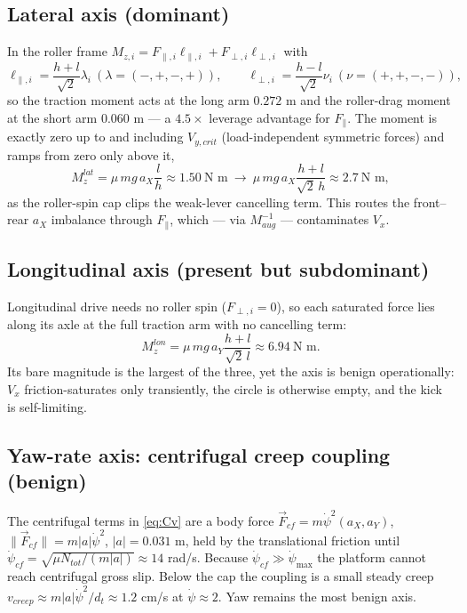 \documentclass[11pt]{article}
\begin{document}
\subsection{Lateral axis (dominant)}
In the roller frame $M_{z,i}=F_{\parallel,i}\ell_{\parallel,i}+F_{\perp,i}\ell_{\perp,i}$ with
\begin{equation}
\ell_{\parallel,i}=\frac{h+l}{\sqrt2}\lambda_i\ (\lambda=(-,+,-,+)),\qquad
\ell_{\perp,i}=\frac{h-l}{\sqrt2}\nu_i\ (\nu=(+,+,-,-)),
\label{eq:arms}
\end{equation}
so the traction moment acts at the long arm $0.272$ m and the roller-drag moment at the short arm
$0.060$ m --- a $4.5\times$ leverage advantage for $F_\parallel$. The moment is exactly zero up to
and including $V_{y,crit}$ (load-independent symmetric forces) and ramps from zero only above it,
\begin{equation}
M_z^{lat}=\mu\,mg\,a_X\frac{l}{h}\approx1.50\ \text{N m}\ \longrightarrow\ \mu\,mg\,a_X\frac{h+l}{\sqrt2\,h}\approx2.7\ \text{N m},
\end{equation}
as the roller-spin cap clips the weak-lever cancelling term. This routes the front--rear $a_X$
imbalance through $F_\parallel$, which --- via $M_{aug}^{-1}$ --- contaminates $V_x$.

\subsection{Longitudinal axis (present but subdominant)}
Longitudinal drive needs no roller spin ($F_{\perp,i}=0$), so each saturated force lies along its
axle at the full traction arm with no cancelling term:
\begin{equation}
M_z^{lon}=\mu\,mg\,a_Y\frac{h+l}{\sqrt2\,l}\approx6.94\ \text{N m}.
\end{equation}
Its bare magnitude is the largest of the three, yet the axis is benign operationally: $V_x$
friction-saturates only transiently, the circle is otherwise empty, and the kick is self-limiting.

\subsection{Yaw-rate axis: centrifugal creep coupling (benign)}
The centrifugal terms in \eqref{eq:Cv} are a body force
$\vec F_{cf}=m\dot\psi^2(a_X,a_Y)$, $\|\vec F_{cf}\|=m|a|\dot\psi^2$, $|a|=0.031$ m, held by the
translational friction until $\dot\psi_{cf}=\sqrt{\mu N_{tot}/(m|a|)}\approx14$ rad/s. Because
$\dot\psi_{cf}\gg\dot\psi_{\max}$ the platform cannot reach centrifugal gross slip. Below the cap
the coupling is a small steady creep $v_{creep}\approx m|a|\dot\psi^2/d_t\approx1.2$ cm/s at
$\dot\psi\approx2$. Yaw remains the most benign axis.
\end{document}

